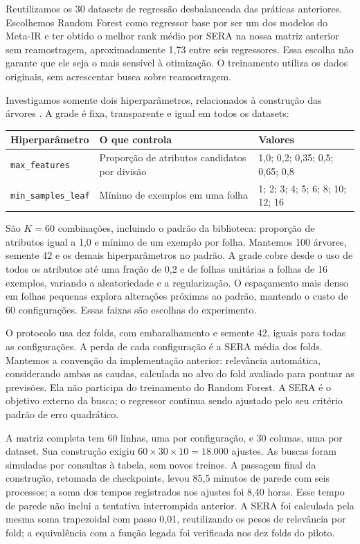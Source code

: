 \documentclass[10pt,a4paper]{article}
\begin{document}
Reutilizamos os 30 datasets de regressão desbalanceada das práticas anteriores. Escolhemos Random Forest como regressor base por ser um dos modelos do Meta-IR e ter obtido o melhor rank médio por SERA na nossa matriz anterior sem reamostragem, aproximadamente 1,73 entre seis regressores. Essa escolha não garante que ele seja o mais sensível à otimização. O treinamento utiliza os dados originais, sem acrescentar busca sobre reamostragem.

Investigamos somente dois hiperparâmetros, relacionados à construção das árvores \cite{probst}. A grade é fixa, transparente e igual em todos os datasets:

\begin{center}\small
\begin{tabularx}{\linewidth}{lYY}
\toprule
Hiperparâmetro & O que controla & Valores \\
\midrule
\texttt{max\_features} & Proporção de atributos candidatos por divisão & 1,0; 0,2; 0,35; 0,5; 0,65; 0,8 \\
\texttt{min\_samples\_leaf} & Mínimo de exemplos em uma folha & 1; 2; 3; 4; 5; 6; 8; 10; 12; 16 \\
\bottomrule
\end{tabularx}
\end{center}

São $K=60$ combinações, incluindo o padrão da biblioteca: proporção de atributos igual a 1,0 e mínimo de um exemplo por folha. Mantemos 100 árvores, semente 42 e os demais hiperparâmetros no padrão. A grade cobre desde o uso de todos os atributos até uma fração de 0,2 e de folhas unitárias a folhas de 16 exemplos, variando a aleatoriedade e a regularização. O espaçamento mais denso em folhas pequenas explora alterações próximas ao padrão, mantendo o custo de 60 configurações. Essas faixas são escolhas do experimento.

O protocolo usa dez folds, com embaralhamento e semente 42, iguais para todas as configurações. A perda de cada configuração é a SERA média dos folds. Mantemos a convenção da implementação anterior: relevância automática, considerando ambas as caudas, calculada no alvo do fold avaliado para pontuar as previsões. Ela não participa do treinamento do Random Forest. A SERA é o objetivo externo da busca; o regressor continua sendo ajustado pelo seu critério padrão de erro quadrático.

A matriz completa tem 60 linhas, uma por configuração, e 30 colunas, uma por dataset. Sua construção exigiu $60\times30\times10=18.000$ ajustes. As buscas foram simuladas por consultas à tabela, sem novos treinos. A passagem final da construção, retomada de checkpoints, levou 85,5 minutos de parede com seis processos; a soma dos tempos registrados nos ajustes foi 8,40 horas. Esse tempo de parede não inclui a tentativa interrompida anterior. A SERA foi calculada pela mesma soma trapezoidal com passo 0,01, reutilizando os pesos de relevância por fold; a equivalência com a função legada foi verificada nos dez folds do piloto.
\end{document}
